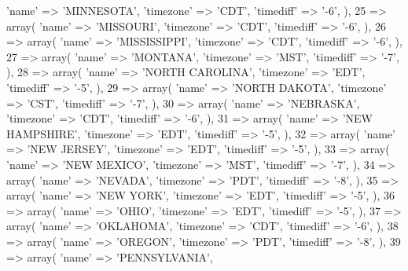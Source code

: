 {{{{{{                    'name' => 'MINNESOTA',
                    'timezone' => 'CDT',
                    'timediff' => '-6',
                ),
                25 => array(
                    'name' => 'MISSOURI',
                    'timezone' => 'CDT',
                    'timediff' => '-6',
                ),
                26 => array(
                    'name' => 'MISSISSIPPI',
                    'timezone' => 'CDT',
                    'timediff' => '-6',
                ),
                27 => array(
                    'name' => 'MONTANA',
                    'timezone' => 'MST',
                    'timediff' => '-7',
                ),
                28 => array(
                    'name' => 'NORTH CAROLINA',
                    'timezone' => 'EDT',
                    'timediff' => '-5',
                ),
                29 => array(
                    'name' => 'NORTH DAKOTA',
                    'timezone' => 'CST',
                    'timediff' => '-7',
                ),
                30 => array(
                    'name' => 'NEBRASKA',
                    'timezone' => 'CDT',
                    'timediff' => '-6',
                ),
                31 => array(
                    'name' => 'NEW HAMPSHIRE',
                    'timezone' => 'EDT',
                    'timediff' => '-5',
                ),
                32 => array(
                    'name' => 'NEW JERSEY',
                    'timezone' => 'EDT',
                    'timediff' => '-5',
                ),
                33 => array(
                    'name' => 'NEW MEXICO',
                    'timezone' => 'MST',
                    'timediff' => '-7',
                ),
                34 => array(
                    'name' => 'NEVADA',
                    'timezone' => 'PDT',
                    'timediff' => '-8',
                ),
                35 => array(
                    'name' => 'NEW YORK',
                    'timezone' => 'EDT',
                    'timediff' => '-5',
                ),
                36 => array(
                    'name' => 'OHIO',
                    'timezone' => 'EDT',
                    'timediff' => '-5',
                ),
                37 => array(
                    'name' => 'OKLAHOMA',
                    'timezone' => 'CDT',
                    'timediff' => '-6',
                ),
                38 => array(
                    'name' => 'OREGON',
                    'timezone' => 'PDT',
                    'timediff' => '-8',
                ),
                39 => array(
                    'name' => 'PENNSYLVANIA',
}}}}}}
